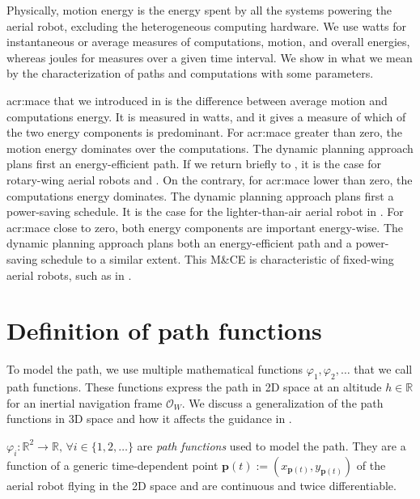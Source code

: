 Physically, motion energy is the energy spent by all the systems powering the aerial robot, excluding the heterogeneous computing hardware. We use watts for instantaneous or average measures of computations, motion, and overall energies, whereas joules for measures over a given time interval. We show in  what we mean by the characterization of paths and computations with some parameters.

\Gls{acr:mace} that we introduced in  is the difference between average motion and computations energy. It is measured in watts, and it gives a measure of which of the two energy components is predominant. For \Gls{acr:mace} greater than zero, the motion energy dominates over the computations. The dynamic planning approach plans first an energy-efficient path. If we return briefly to , it is the case for rotary-wing aerial robots  and . On the contrary, for \Gls{acr:mace} lower than zero, the computations energy dominates. The dynamic planning approach plans first a power-saving schedule. It is the case for the lighter-than-air aerial robot  in . For \Gls{acr:mace} close to zero, both energy components are important energy-wise. The dynamic planning approach plans both an energy-efficient path and a power-saving schedule to a similar extent. This M\&CE is characteristic of fixed-wing aerial robots, such as  in .


\section{Definition of path functions}
\label{sec:path-functions}

To model the path, we use multiple mathematical functions $\varphi_1,\varphi_2,\dots$ that we call path functions. These functions express the path in 2D space at an altitude $h\in\mathbb{R}$ for an inertial navigation frame $\mathcal{O}_W$. We discuss a generalization of the path functions in 3D space and how it affects the guidance in . 

\begin{highlight}
  \begin{defn}\label{def:paths}
    $\varphi_i:\mathbb{R}^2\rightarrow\mathbb{R},\,\forall i\in\{1,2,\dots\}$ are \emph{path functions} used to model the path. They are a function of a generic time-dependent point $\mathbf{p}(t):=(x_{\mathbf{p}(t)},y_{\mathbf{p}(t)})$ of the aerial robot flying in the 2D space and are continuous and twice differentiable. 
  \end{defn}
\end{highlight}

